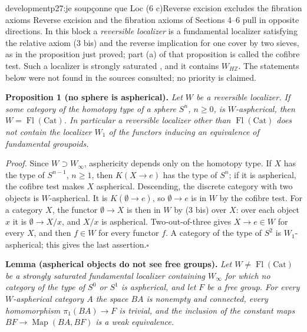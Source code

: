 \begin{dcomment}{development}{p27:je soupçonne que Loc (6 c)}{Reverse excision excludes the fibration axioms}
Reverse excision and the fibration axioms of Sections 4--6 pull in opposite directions. In this block a \emph{reversible localizer} is a fundamental localizer satisfying the relative axiom (3 bis) and the reverse implication for one cover by two sieves, as in the proposition just proved; part (a) of that proposition is called the cofibre test. Such a localizer is strongly saturated \citep[Proposition~4.2.4]{Cisinski2006}, and it contains $W_{H\mathbb Z}$. The statements below were not found in the sources consulted; no priority is claimed.

\textbf{Proposition 1 (no sphere is aspherical).}\ours
\textit{Let $W$ be a reversible localizer. If some category of the homotopy type of a sphere $S^n$, $n\geq0$, is $W$-aspherical, then $W=\operatorname{Fl}(\mathrm{Cat})$. In particular a reversible localizer other than $\operatorname{Fl}(\mathrm{Cat})$ does not contain the localizer $W_1$ of the functors inducing an equivalence of fundamental groupoids.}

\textit{Proof.}
Since $W\supset W_\infty$, asphericity depends only on the homotopy type. If $X$ has the type of $S^{n-1}$, $n\geq1$, then $K(X\to e)$ has the type of $S^n$; if it is aspherical, the cofibre test makes $X$ aspherical. Descending, the discrete category with two objects is $W$-aspherical. It is $K(\emptyset\to e)$, so $\emptyset\to e$ is in $W$ by the cofibre test. For a category $X$, the functor $\emptyset\to X$ is then in $W$ by (3 bis) over $X$: over each object $x$ it is $\emptyset\to X/x$, and $X/x$ is aspherical. Two-out-of-three gives $X\to e\in W$ for every $X$, and then $f\in W$ for every functor $f$. A category of the type of $S^2$ is $W_1$-aspherical; this gives the last assertion.\hfill$\square$

\textbf{Lemma (aspherical objects do not see free groups).}\ours
\textit{Let $W\neq\operatorname{Fl}(\mathrm{Cat})$ be a strongly saturated fundamental localizer containing $W_\infty$ for which no category of the type of $S^0$ or $S^1$ is aspherical, and let $F$ be a free group. For every $W$-aspherical category $A$ the space $BA$ is nonempty and connected, every homomorphism $\pi_1(BA)\to F$ is trivial, and the inclusion of the constant maps $BF\to\operatorname{Map}(BA,BF)$ is a weak equivalence.}


\end{dcomment}
